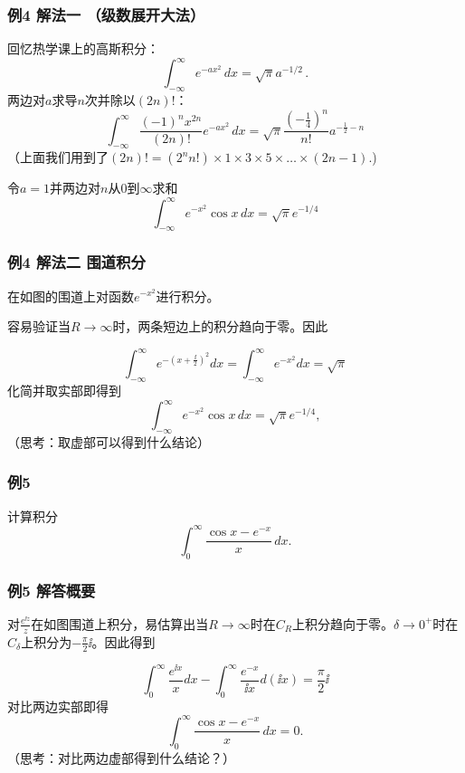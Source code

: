 \documentclass[CJK]{beamer}
\begin{document}
\begin{frame}
  \frametitle{例4 解法一 （级数展开大法）}
  
  回忆热学课上的高斯积分：
  $$\int_{-\infty}^{\infty} e^{-ax^2}\,dx = \sqrt{\pi} a^{-1/2}\, .$$
  两边对$a$求导$n$次并除以$(2n)!$：
  $$\int_{-\infty}^{\infty} \frac{(-1)^nx^{2n}}{(2n)!} e^{-ax^2} \,dx= \sqrt{\pi}\frac{(-\frac{1}{4})^n}{n!} a^{-\frac{1}{2}-n}$$
  {\scriptsize （上面我们用到了$(2n)! = (2^n n!) \times 1\times 3\times 5\times\ldots \times(2n-1)$.)}
    
    令$a=1$并两边对$n$从$0$到$\infty$求和
  $$\int_{-\infty}^{\infty}  e^{-x^2}\cos x\,dx = \sqrt{\pi}e^{-1/4}$$
  
\end{frame}

\begin{frame}
  \frametitle{例4 解法二 围道积分}
  


  在如图的围道上对函数$e^{-x^2}$进行积分。

  容易验证当$R\rightarrow \infty$时，两条短边上的积分趋向于零。因此

  $$\int_{-\infty}^{\infty} e^{-(x+\frac{\ii}{2})^2}dx = \int_{-\infty}^{\infty} e^{-x^2}dx  =\sqrt{\pi}$$
  化简并取实部即得到
  $$\int_{-\infty}^{\infty}  e^{-x^2}\cos x\,dx = \sqrt{\pi}e^{-1/4},$$
  {\scriptsize （思考：取虚部可以得到什么结论）}

  
\end{frame}



\begin{frame}
  \frametitle{例5}
  
  计算积分$$ \int_0^{\infty} \frac{\cos{x} - e^{-x}}{x}\, dx.$$
  
\end{frame}


\begin{frame}
  \frametitle{例5 解答概要}
  
  \emini
  对$\frac{e^{\ii z}}{z}$在如图围道上积分，易估算出当$R\rightarrow \infty$时在$C_R$上积分趋向于零。$\delta\rightarrow 0^+$时在$C_\delta$上积分为$-\frac{\pi}{2}\ii$。因此得到
  \emini
  
  $$\int_0^\infty \frac{e^{\ii x}}{x} dx - \int_0^\infty \frac{e^{- x}}{\ii x} d(\ii x)  = \frac{\pi}{2}\ii$$
  对比两边实部即得
  $$ \int_0^{\infty} \frac{\cos{x} - e^{-x}}{x}\, dx = 0.$$
  {\scriptsize （思考：对比两边虚部得到什么结论？）}
  
\end{frame}
\end{document}
